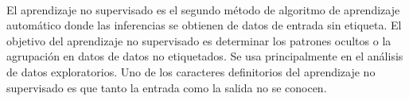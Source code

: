 \documentclass[11pt,a4paper]{article}
\begin{document}
	    \\El aprendizaje no supervisado es el segundo método de algoritmo de aprendizaje automático donde las inferencias se obtienen de datos de entrada sin etiqueta. El objetivo del aprendizaje no supervisado es determinar los patrones ocultos o la agrupación en datos de datos no etiquetados. Se usa principalmente en el análisis de datos exploratorios. Uno de los caracteres definitorios del aprendizaje no supervisado es que tanto la entrada como la salida no se conocen.\\
			
	    
\end{document}
